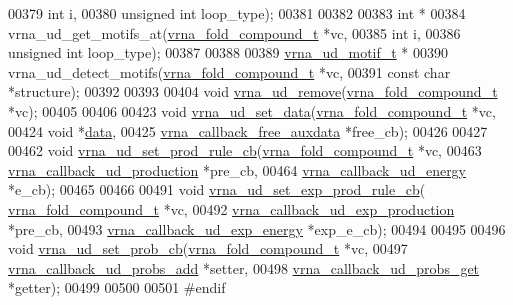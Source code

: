 \begin{DoxyCode}
00379                                \textcolor{keywordtype}{int}                  i,
00380                                \textcolor{keywordtype}{unsigned} \textcolor{keywordtype}{int}         loop\_type);
00381 
00382 
00383 \textcolor{keywordtype}{int} *
00384 vrna\_ud\_get\_motifs\_at(\hyperlink{group__fold__compound_structvrna__fc__s}{vrna\_fold\_compound\_t}  *vc,
00385                       \textcolor{keywordtype}{int}                   i,
00386                       \textcolor{keywordtype}{unsigned} \textcolor{keywordtype}{int}          loop\_type);
00387 
00388 
00389 \hyperlink{structvrna__unstructured__domain__motif__s}{vrna\_ud\_motif\_t} *
00390 vrna\_ud\_detect\_motifs(\hyperlink{group__fold__compound_structvrna__fc__s}{vrna\_fold\_compound\_t}  *vc,
00391                       \textcolor{keyword}{const} \textcolor{keywordtype}{char}            *structure);
00392 
00393 
00404 \textcolor{keywordtype}{void}  \hyperlink{group__domains__up_gada59cb0c498b812eadd010811af3f2d4}{vrna\_ud\_remove}(\hyperlink{group__fold__compound_structvrna__fc__s}{vrna\_fold\_compound\_t} *vc);
00405 
00406 
00423 \textcolor{keywordtype}{void}  \hyperlink{group__domains__up_gac1f18c312b91d80089534a87d956e58b}{vrna\_ud\_set\_data}(\hyperlink{group__fold__compound_structvrna__fc__s}{vrna\_fold\_compound\_t}       *vc,
00424                        \textcolor{keywordtype}{void}                       *\hyperlink{group__domains__up_a8802b1b0512999a9f35202031811ce17}{data},
00425                        \hyperlink{group__fold__compound_ga7806651f51b195013839a218b3bbd5a3}{vrna\_callback\_free\_auxdata} *free\_cb);
00426 
00427 
00462 \textcolor{keywordtype}{void} \hyperlink{group__domains__up_ga745a99f0bc72898d54de16f6e538828a}{vrna\_ud\_set\_prod\_rule\_cb}(\hyperlink{group__fold__compound_structvrna__fc__s}{vrna\_fold\_compound\_t}        *vc,
00463                               \hyperlink{group__domains__up_ga4fdfc02c1b660c07f2d887772f02a0a1}{vrna\_callback\_ud\_production} *pre\_cb,
00464                               \hyperlink{group__domains__up_ga75825c57d0bfde4ae4f95c044260c5c3}{vrna\_callback\_ud\_energy}     *e\_cb);
00465 
00466 
00491 \textcolor{keywordtype}{void}  \hyperlink{group__domains__up_ga2fb1db2099da26c76247e1209ad4aa09}{vrna\_ud\_set\_exp\_prod\_rule\_cb}(
      \hyperlink{group__fold__compound_structvrna__fc__s}{vrna\_fold\_compound\_t}             *vc,
00492                                    \hyperlink{group__domains__up_ga33d78327dcd04c1ca5ab2887edc18c7b}{vrna\_callback\_ud\_exp\_production}  *pre\_cb,
00493                                    \hyperlink{group__domains__up_ga861706f257ba993753464b823e65b86e}{vrna\_callback\_ud\_exp\_energy}      *exp\_e\_cb);
00494 
00495 
00496 \textcolor{keywordtype}{void}  \hyperlink{unstructured__domains_8h_a13ac877c9db89a1a5b5d9c0394148595}{vrna\_ud\_set\_prob\_cb}(\hyperlink{group__fold__compound_structvrna__fc__s}{vrna\_fold\_compound\_t}        *vc,
00497                           \hyperlink{group__domains__up_gab10498abc84fcaf336aca8f8d7d42eb2}{vrna\_callback\_ud\_probs\_add}  *setter,
00498                           \hyperlink{group__domains__up_gaa10ba1b6f1e179ea84c5caca9cdaae67}{vrna\_callback\_ud\_probs\_get}  *getter);
00499 
00500 
00501 \textcolor{preprocessor}{#endif}
\end{DoxyCode}
